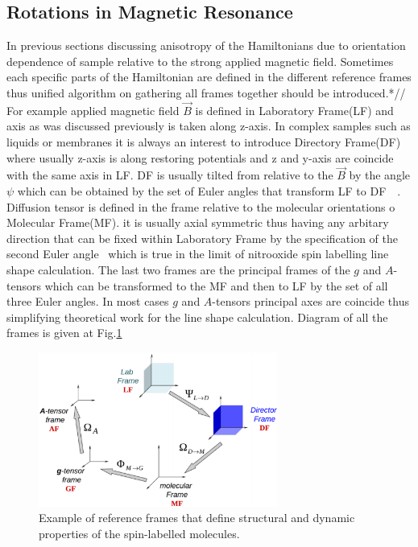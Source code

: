 \subsection{Rotations in Magnetic Resonance}
In previous sections discussing anisotropy of the Hamiltonians due to orientation dependence of sample relative to the strong applied magnetic field. Sometimes each specific parts of the Hamiltonian are defined in the different reference frames thus unified algorithm on gathering all frames together should be introduced.*//  
For example applied magnetic field $\vec{B}$ is defined in Laboratory Frame(LF) and axis as was discussed previously is taken along z-axis. In complex samples such as liquids or membranes it is always an interest to introduce Directory Frame(DF) where usually z-axis is along restoring potentials and z and y-axis are coincide with the same axis in LF. DF is usually tilted from relative to the $\vec{B}$ by the angle $\psi$ which can be obtained by the set of Euler angles that transform LF to DF~\cite{rotat}~\cite{bmr}. Diffusion tensor is defined in the frame relative to the molecular orientations o Molecular Frame(MF). it is usually axial symmetric thus having any arbitary direction that can be fixed within Laboratory Frame by the specification of the second Euler angle~\cite{bmr} which is true in the limit of nitrooxide spin labelling line shape calculation. The last two frames are the principal frames of the $g$ and $A$-tensors which can be transformed to the MF and then to LF by the set of all three Euler angles. In most cases $g$ and $A$-tensors principal axes are coincide thus simplifying theoretical work for the line shape calculation. Diagram of all the frames is given at Fig.\ref{figure:rotat}
\begin{figure}[h]
\centering
\includegraphics[width=0.7\textwidth]{figures/chap1/frames.eps}
\caption{Example of reference frames that define structural and dynamic properties of the spin-labelled molecules.~\cite{rotat}}
\label{figure:rotat}
\end{figure}
